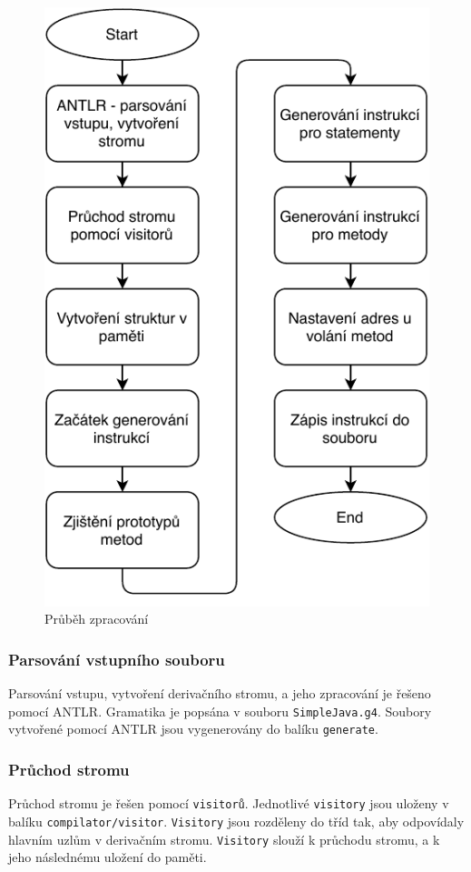 \documentclass[12pt, a4paper]{article}
\begin{document}
\begin{figure}[!h]
  \centering
  \includegraphics[scale=0.8]{img/diagram.pdf}
  \caption{Průběh zpracování}
  \label{fig:zpracovani}
\end{figure}
\newpage
\subsubsection{Parsování vstupního souboru}
\noindent Parsování vstupu, vytvoření derivačního stromu, a jeho zpracování je řešeno pomocí \textsf{ANTLR}. Gramatika je popsána v souboru \texttt{SimpleJava.g4}. Soubory vytvořené pomocí \textsf{ANTLR} jsou vygenerovány do balíku \texttt{generate}.

\subsubsection{Průchod stromu}
\noindent Průchod stromu je řešen pomocí \texttt{visitorů}. Jednotlivé \texttt{visitory} jsou uloženy v balíku \texttt{compilator/visitor}. \texttt{Visitory} jsou rozděleny do tříd tak, aby odpovídaly hlavním uzlům v derivačním stromu. \texttt{Visitory} slouží k průchodu stromu, a k jeho následnému uložení do paměti.
\end{document}
